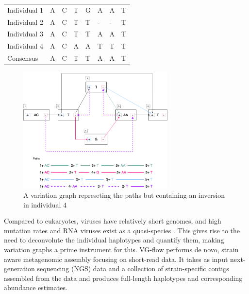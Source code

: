 \documentclass[10pt, a4paper]{article}
\begin{document}
\begin{center}
\begin{tabular}{llllllll}
\color{mypink}Individual 1 & \color{mypink} A & \color{mypink} C & \color{mypink} T & \color{mypink} G & \color{mypink} A & \color{mypink} A & \color{mypink} T\\
\color{myblue}Individual 2 & \color{myblue} A & \color{myblue} C & \color{myblue} T & \color{myblue} T & \color{myblue} - & \color{myblue} - & \color{myblue} T\\
\color{mygreen}Individual 3 & \color{mygreen} A & \color{mygreen} C & \color{mygreen} T & \color{mygreen} T & \color{mygreen} A & \color{mygreen} A & \color{mygreen} T\\
\color{mypurple}Individual 4 & \color{mypurple} A & \color{mypurple} C & \color{mypurple} A & \color{mypurple} A & \color{mypurple} T & \color{mypurple} T & \color{mypurple} T\\
\hline
\color{red}Consensus & \color{red} A & \color{red} C & \color{red} T & \color{red} T & \color{red} A & \color{myred} A & \color{red} T\\
\end{tabular}

\end{center}


\begin{figure}[h!]
\centering
\includegraphics[width=0.7\textwidth]{./figures/Variation-Graph-Page-2.png}
\caption[Variation Graph with Inversion]{\label{fig:orgd07afad}A variation graph represeting the paths but containing an inversion in individual 4}
\end{figure}


Compared to eukaryotes, viruses have relatively short genomes, and high
mutation rates \cite{duffyWhyAreRNA2018} and RNA viruses exist as a quasi-species
\cite{domingoViralQuasispeciesEvolution2012}.
This gives rise to the need to deconvolute the individual haplotypes and
quantify them, making variation graphs a prime instrument for this.
VG-flow \cite{baaijensStrainawareAssemblyGenomes2019} performs de novo, strain aware metagenomic
assembly focusing on short-read data.  It takes as input next-generation
sequencing (NGS) data and a collection of strain-specific contigs assembled from
the data and produces full-length haplotypes and corresponding abundance
estimates.
\end{document}
